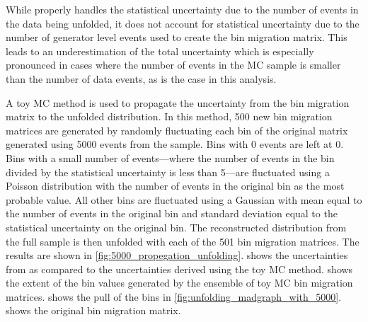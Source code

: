 While \RooUnfold properly handles the statistical uncertainty due to the number
of events in the data being unfolded, it does not account for statistical
uncertainty due to the number of generator level events used to create the
bin migration matrix. This leads to an underestimation of the total uncertainty
which is especially pronounced in cases where the number of events in the
MC sample is smaller than the number of data events, as is the case in this
analysis.

A toy MC method is used to propagate the uncertainty from the bin migration
matrix to the unfolded distribution. In this method, \num{500} new bin
migration matrices are generated by randomly fluctuating each bin of the
original matrix generated using \num{5000} events from the \POWHEG sample. Bins
with \num{0} events are left at \num{0}. Bins with a small number of
events---where the number of events in the bin divided by the statistical
uncertainty is less than \num{5}---are fluctuated using a Poisson distribution
with the number of events in the original bin as the most probable value. All
other bins are fluctuated using a Gaussian with mean equal to the number of
events in the original bin and standard deviation equal to the statistical
uncertainty on the original bin. The reconstructed \phistar distribution from
the full \MADGRAPH sample is then unfolded with each of the \num{501} bin
migration matrices. The results are shown in
\cref{fig:5000_propegation_unfolding}.
 shows the uncertainties from
\RooUnfold as compared to the uncertainties derived using the toy MC method.
 shows the extent of the \phistar bin values
generated by the ensemble of toy MC bin migration matrices.
 shows the pull of the bins in
\cref{fig:unfolding_madgraph_with_5000}.
 shows the original bin migration matrix.

